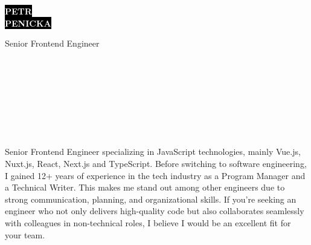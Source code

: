 \documentclass[9pt]{developercv}
\begin{document}
\begin{minipage}[t]{0.41\textwidth}
  \vspace{-\baselineskip}

  \colorbox{black}{{\HUGE\textcolor{white}{\textbf{\MakeUppercase{Petr}}}}}
  \\
  \colorbox{black}{{\HUGE\textcolor{white}{\textbf{\MakeUppercase{Penicka}}}}}

  \vspace{6pt}

  {\huge Senior Frontend Engineer}
\end{minipage}
\begin{minipage}[t]{0.275\textwidth}
  \vspace{-\baselineskip}

  \\
  \\
  \\
\end{minipage}
\begin{minipage}[t]{0.34\textwidth}
  \vspace{-\baselineskip}

  \\
  \\
  \\
\end{minipage}

\vspace{0.5cm}


\begin{minipage}[t]{1\textwidth}
  \vspace{-\baselineskip}

  {Senior Frontend Engineer specializing in JavaScript technologies, mainly Vue.js, Nuxt.js, React, Next.js and TypeScript. Before switching to software engineering, I gained 12+ years of experience in the tech industry as a Program Manager and a Technical Writer. This makes me stand out among other engineers due to strong communication, planning, and organizational skills. If you’re seeking an engineer who not only delivers high-quality code but also collaborates seamlessly with colleagues in non-technical roles, I believe I would be an excellent fit for your team.}\\
\end{minipage}
\end{document}
